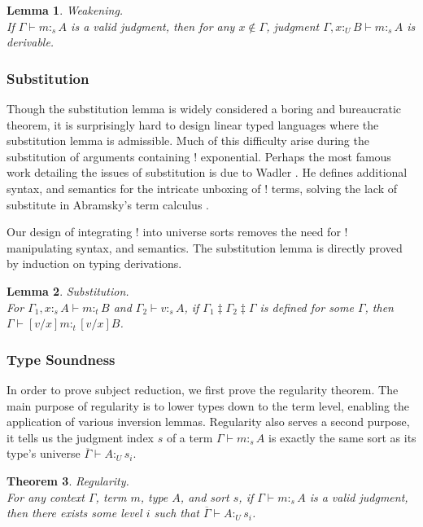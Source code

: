 \documentclass{article}
\newtheorem{theorem}{Theorem}[section]
\newtheorem{lemma}[theorem]{Lemma}
\theoremstyle{definition}
\newcommand{\utype}{:_{\scriptscriptstyle U}}
\newcommand{\stype}[1]{:_#1}
\newcommand{\mrg}[3]{#1\ddagger#2\ddagger#3}
\begin{document}
  \begin{lemma} Weakening. \\
    If $\Gamma \vdash m \stype{s} A$ is a valid judgment, then for any $x \notin \Gamma$, judgment $\Gamma, x \utype B \vdash m \stype{s} A$ is derivable.
  \end{lemma}

  \subsubsection{Substitution} \label{subst}
  Though the substitution lemma is widely considered a boring and bureaucratic theorem, it is surprisingly hard to design linear typed languages where the substitution lemma is admissible. Much of this difficulty arise during the substitution of arguments containing ! exponential. Perhaps the most famous work detailing the issues of substitution is due to Wadler \cite{substitute}. He defines additional syntax, and semantics for the intricate unboxing of ! terms, solving the lack of substitute in Abramsky's term calculus \cite{abramsky1993}.

  Our design of integrating ! into universe sorts removes the need for ! manipulating syntax, and semantics. The substitution lemma is directly proved by induction on typing derivations.

  \begin{lemma} Substitution. \\
    For $\Gamma_1, x \stype{s} A \vdash m \stype{t} B$ and $\Gamma_2 \vdash v \stype{s} A$, if $\mrg{\Gamma_1}{\Gamma_2}{\Gamma}$ is defined for some $\Gamma$, then $\Gamma \vdash [v/x]m \stype{t} [v/x]B$.
  \end{lemma}

  \subsubsection{Type Soundness}
  In order to prove subject reduction, we first prove the regularity theorem. The main purpose of regularity is to lower types down to the term level, enabling the application of various inversion lemmas. Regularity also serves a second purpose, it tells us the judgment index $s$ of a term $\Gamma \vdash m \stype{s} A$ is exactly the same sort as its type's universe $\overline{\Gamma} \vdash A \utype s_i$.

  \begin{theorem} Regularity. \\
     For any context $\Gamma$, term $m$, type $A$, and sort $s$, if $\Gamma \vdash m \stype{s} A$ is a valid judgment, then there exists some level $i$ such that $\overline{\Gamma} \vdash A \utype s_i$.
    \label{regularity}
  \end{theorem}
\end{document}
